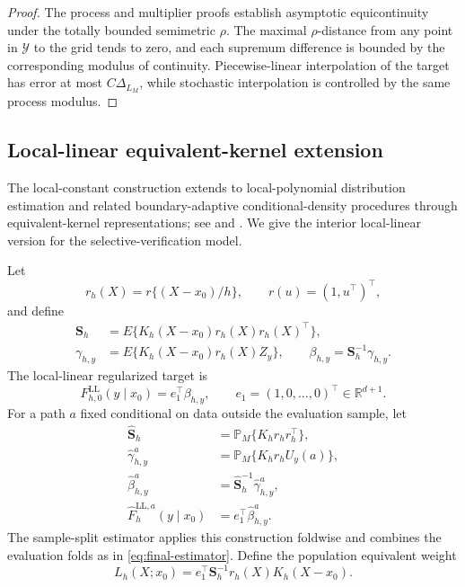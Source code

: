 \begin{proof}
The process and multiplier proofs establish asymptotic equicontinuity under the totally bounded semimetric \(\rho\). The maximal \(\rho\)-distance from any point in \(\mathcal Y\) to the grid tends to zero, and each supremum difference is bounded by the corresponding modulus of continuity. Piecewise-linear interpolation of the target has error at most \(C\Delta_{L_M}\), while stochastic interpolation is controlled by the same process modulus.
\end{proof}

\subsection{Local-linear equivalent-kernel extension}

The local-constant construction extends to local-polynomial distribution estimation and related boundary-adaptive conditional-density procedures through equivalent-kernel representations; see \citet{CattaneoJanssonMa2024} and \citet{CattaneoEtAl2024}. We give the interior local-linear version for the selective-verification model.

Let
\[
r_h(X)=r\{(X-x_0)/h\},
\qquad
r(u)=(1,u^\top)^\top,
\]
and define
\begin{align}
\mathbf S_h
&=E\{K_h(X-x_0)r_h(X)r_h(X)^\top\},
\label{eq:ll-gram}\\
\gamma_{h,y}
&=E\{K_h(X-x_0)r_h(X)Z_y\},
\qquad
\beta_{h,y}=\mathbf S_h^{-1}\gamma_{h,y}.
\label{eq:ll-beta}
\end{align}
The local-linear regularized target is
\begin{equation}
F_{h,0}^{\mathrm{LL}}(y\mid x_0)
=e_1^\top\beta_{h,y},
\qquad
e_1=(1,0,\ldots,0)^\top\in\mathbb R^{d+1}.
\label{eq:ll-target}
\end{equation}
For a path \(a\) fixed conditional on data outside the evaluation sample, let
\begin{align*}
\widehat{\mathbf S}_h
&=\mathbb P_M\{K_hr_hr_h^\top\},\\
\widehat\gamma_{h,y}^{a}
&=\mathbb P_M\{K_hr_hU_y(a)\},\\
\widehat\beta_{h,y}^{a}
&=\widehat{\mathbf S}_h^{-1}\widehat\gamma_{h,y}^{a},\\
\widehat F_h^{\mathrm{LL},a}(y\mid x_0)
&=e_1^\top\widehat\beta_{h,y}^{a}.
\end{align*}
The sample-split estimator applies this construction foldwise and combines the evaluation folds as in \eqref{eq:final-estimator}. Define the population equivalent weight
\begin{equation}
L_h(X;x_0)
=e_1^\top\mathbf S_h^{-1}r_h(X)K_h(X-x_0).
\label{eq:ll-weight}
\end{equation}

